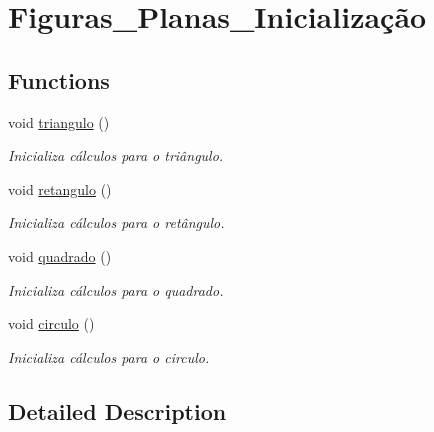 \hypertarget{group__Figuras__Planas__Inicializa_xC3_xA7_xC3_xA3o}{}\section{Figuras\+\_\+\+Planas\+\_\+\+Inicialização}
\label{group__Figuras__Planas__Inicializa_xC3_xA7_xC3_xA3o}
\subsection*{Functions}
\begin{DoxyCompactItemize}
\item 
void \hyperlink{group__Figuras__Planas__Inicializa_xC3_xA7_xC3_xA3o_ga8928cef04d4cd48e92adf3569f6d185b}{triangulo} ()\hypertarget{group__Figuras__Planas__Inicializa_xC3_xA7_xC3_xA3o_ga8928cef04d4cd48e92adf3569f6d185b}{}\label{group__Figuras__Planas__Inicializa_xC3_xA7_xC3_xA3o_ga8928cef04d4cd48e92adf3569f6d185b}

\begin{DoxyCompactList}\small\item\em Inicializa cálculos para o triângulo. \end{DoxyCompactList}\item 
void \hyperlink{group__Figuras__Planas__Inicializa_xC3_xA7_xC3_xA3o_gafa7da114af5845aed90385aaad07745f}{retangulo} ()\hypertarget{group__Figuras__Planas__Inicializa_xC3_xA7_xC3_xA3o_gafa7da114af5845aed90385aaad07745f}{}\label{group__Figuras__Planas__Inicializa_xC3_xA7_xC3_xA3o_gafa7da114af5845aed90385aaad07745f}

\begin{DoxyCompactList}\small\item\em Inicializa cálculos para o retângulo. \end{DoxyCompactList}\item 
void \hyperlink{group__Figuras__Planas__Inicializa_xC3_xA7_xC3_xA3o_ga59a769deb5a89245b0b2a7760179708e}{quadrado} ()\hypertarget{group__Figuras__Planas__Inicializa_xC3_xA7_xC3_xA3o_ga59a769deb5a89245b0b2a7760179708e}{}\label{group__Figuras__Planas__Inicializa_xC3_xA7_xC3_xA3o_ga59a769deb5a89245b0b2a7760179708e}

\begin{DoxyCompactList}\small\item\em Inicializa cálculos para o quadrado. \end{DoxyCompactList}\item 
void \hyperlink{group__Figuras__Planas__Inicializa_xC3_xA7_xC3_xA3o_ga28482bc381ce414df86e4fdb9e3e6da5}{circulo} ()\hypertarget{group__Figuras__Planas__Inicializa_xC3_xA7_xC3_xA3o_ga28482bc381ce414df86e4fdb9e3e6da5}{}\label{group__Figuras__Planas__Inicializa_xC3_xA7_xC3_xA3o_ga28482bc381ce414df86e4fdb9e3e6da5}

\begin{DoxyCompactList}\small\item\em Inicializa cálculos para o circulo. \end{DoxyCompactList}\end{DoxyCompactItemize}


\subsection{Detailed Description}
